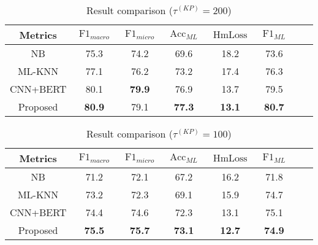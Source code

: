 \begin{table}[htbp!]
    \caption{Result comparison (\(\tau^{(KP)}=200 \))}\label{tbl:bsline1}
    \centering
    \begin{tabular}{cccccccc}
        \toprule
        Metrics  & \(\operatorname{F1}_{macro}\) & \(\operatorname{F1}_{micro}\) & \(\operatorname{Acc}_{ML}\) & \(\operatorname{HmLoss}\) & \(\operatorname{F1}_{ML}\) \\
        \midrule
        NB       & 75.3                          & 74.2                          & 69.6                        & 18.2                      & 73.6                       \\
        ML-KNN   & 77.1                          & 76.2                          & 73.2                        & 17.4                      & 76.3                       \\
        CNN+BERT & 80.1                          & \textbf{79.9}                 & 76.9                        & 13.7                      & 79.5                       \\
        Proposed & \textbf{80.9}                 & 79.1                          & \textbf{77.3}               & \textbf{13.1}             & \textbf{80.7}              \\
        \bottomrule
    \end{tabular}
\end{table}

\begin{table}
    \centering
    \caption{Result comparison (\(\tau^{(KP)}=100 \))}\label{tbl:bsline2}
    \begin{tabular}{cccccccc}
        \toprule
        Metrics  & \(\operatorname{F1}_{macro}\) & \(\operatorname{F1}_{micro}\) & \(\operatorname{Acc}_{ML}\) & \(\operatorname{HmLoss}\) & \(\operatorname{F1}_{ML}\) \\
        \midrule
        NB       & 71.2                          & 72.1                          & 67.2                        & 16.2                      & 71.8                       \\
        ML-KNN   & 73.2                          & 72.3                          & 69.1                        & 15.9                      & 74.7                       \\
        CNN+BERT & 74.4                          & 74.6                          & 72.3                        & 13.1                      & 75.1                       \\
        Proposed & \textbf{75.5}                 & \textbf{75.7}                 & \textbf{73.1}               & \textbf{12.7}             & \textbf{74.9}              \\
        \bottomrule
    \end{tabular}
\end{table}

